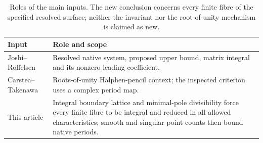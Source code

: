 \begin{table}[htbp]
\centering
\caption{Roles of the main inputs. The new conclusion concerns every
finite fibre of the specified resolved surface; neither the invariant
nor the root-of-unity mechanism is claimed as new.}
\label{tab:ownership}
\begin{tabularx}{\textwidth}{@{}p{}X@{}}
\toprule
Input & Role and scope \\
\midrule
Joshi--Roffelsen \citep{JoshiRoffelsen2026}
& Resolved native system, proposed upper bound, matrix integral and its
  nonzero leading coefficient. \\
Carstea--Takenawa \citep{CarsteaTakenawa2012}
& Roots-of-unity Halphen-pencil context; the inspected criterion uses a
  complex period map. \\
This article
& Integral boundary lattice and minimal-pole divisibility force every
  finite fibre to be integral and reduced in all allowed characteristics;
  smooth and singular point counts then bound native periods. \\
\bottomrule
\end{tabularx}
\end{table}
